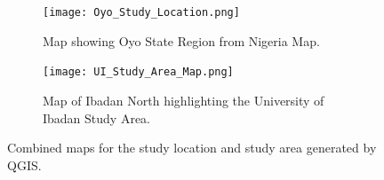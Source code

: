 \documentclass[12pt,a4paper]{report}
\begin{document}
\begin{figure}[H]
    \centering
    \begin{subfigure}[t]{0.89\textwidth}
        \centering
        \texttt{[image: Oyo\_Study\_Location.png]}
        \caption{Map showing Oyo State Region from Nigeria Map.}
        \label{fig:Oyo Study Location}
    \end{subfigure}
    \vspace{1cm} 
    \begin{subfigure}[t]{1.0\textwidth}
        \centering
        \texttt{[image: UI\_Study\_Area\_Map.png]}
        \caption{Map of Ibadan North highlighting the University of Ibadan Study Area.}
        \label{fig:UI Study Area}
    \end{subfigure}
    
    \caption{Combined maps for the study location and study area generated by QGIS.}
    \label{fig:Combined Maps}
\end{figure}
\end{document}
